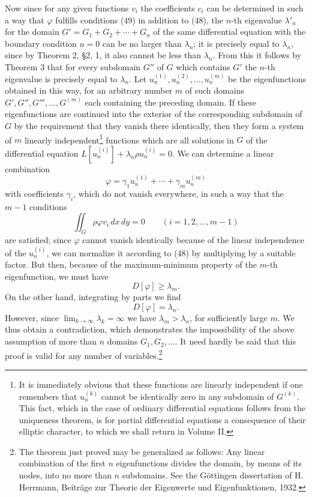 Now since for any given functions $v_i$ the coefficients $c_i$ can be determined in such a way that $\varphi$ fulfills conditions (49) in addition to (48), the $n$-th eigenvalue $\lambda'_n$ for the domain $G'=G_1+G_2+\cdots+G_n$ of the same differential equation with the boundary condition $u=0$ can be no larger than $\lambda_n$; it is precisely equal to $\lambda_n$, since by Theorem 2, \S2, 1, it also cannot be less than $\lambda_n$. From this it follows by Theorem 3 that for every subdomain $G''$ of $G$ which contains $G'$ the $n$-th eigenvalue is precisely equal to $\lambda_n$. Let $u_n^{(1)},u_n^{(2)},\ldots,u_n^{(m)}$ be the eigenfunctions obtained in this way, for an arbitrary number $m$ of such domains $G',G'',G''',\ldots,G^{(m)}$ each containing the preceding domain. If these eigenfunctions are continued into the exterior of the corresponding subdomain of $G$ by the requirement that they vanish there identically, then they form a system of $m$ linearly independent\footnote{It is immediately obvious that these functions are linearly independent if one remembers that $u_n^{(k)}$ cannot be identically zero in any subdomain of $G^{(k)}$. This fact, which in the case of ordinary differential equations follows from the uniqueness theorem, is for partial differential equations a consequence of their elliptic character, to which we shall return in Volume II.} functions which are all solutions in $G$ of the differential equation $L[u_n^{(i)}]+\lambda_n\rho u_n^{(i)}=0$. We can determine a linear combination
\[
\varphi=\gamma_1u_n^{(1)}+\cdots+\gamma_mu_n^{(m)}
\]
with coefficients $\gamma_i$, which do not vanish everywhere, in such a way that the $m-1$ conditions
\[
\iint_G\rho\varphi v_i\,dx\,dy=0\qquad(i=1,2,\ldots,m-1)
\]
are satisfied; since $\varphi$ cannot vanish identically because of the linear independence of the $u_n^{(i)}$, we can normalize it according to (48) by multiplying by a suitable factor. But then, because of the maximum-minimum property of the $m$-th eigenfunction, we must have
\[
D[\varphi]\ge\lambda_m.
\]
On the other hand, integrating by parts we find
\[
D[\varphi]=\lambda_n.
\]
However, since $\lim_{k\to\infty}\lambda_k=\infty$ we have $\lambda_m>\lambda_n$, for sufficiently large $m$. We thus obtain a contradiction, which demonstrates the impossibility of the above assumption of more than $n$ domains $G_1,G_2,\ldots$. It need hardly be said that this proof is valid for any number of variables.\footnote{The theorem just proved may be generalized as follows: Any linear combination of the first $n$ eigenfunctions divides the domain, by means of its nodes, into no more than $n$ subdomains. See the Göttingen dissertation of H. Herrmann, Beiträge zur Theorie der Eigenwerte und Eigenfunktionen, 1932.}

